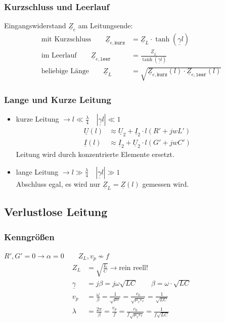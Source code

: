 \subsubsection{Kurzschluss und Leerlauf}
Eingangswiderstand $ \underline{Z}_e $ am Leitungsende:
\begin{align*}
\text{mit Kurzschluss} \qquad \underline{Z}_{e,\texttt{kurz}} & = \underline{Z}_L \cdot \tanh(\underline{\gamma}l)\\
\text{im Leerlauf} \qquad 
\underline{Z}_{e,\texttt{leer}} & = \tfrac{\underline{Z}_L}{\tanh(\underline{\gamma}l)}\\
\text{beliebige Länge} \qquad \underline{Z}_L &=\sqrt{\underline{Z}_{e,\texttt{kurz}}(l)\cdot \underline{Z}_{e,\texttt{leer}}(l)}
\end{align*}
\subsubsection{Lange und Kurze Leitung}
\begin{itemize}
	\item kurze Leitung $\rightarrow l \ll \tfrac{\lambda}{4} \quad |\underline{\gamma}l| \ll 1 $
		\begin{align*}
			\underline{U}(l) &\approx \underline{U}_2 + \underline{I}_2 \cdot l (R' + jwL')\\
			\underline{I}(l) &\approx \underline{I}_2 + \underline{U}_2 \cdot l (G'+jwC')
		\end{align*}
	Leitung wird durch konzentrierte Elemente ersetzt.
	\item lange Leitung $\rightarrow l \gg \tfrac{\lambda}{4} \quad |\underline{\gamma}l| \gg 1$\\
	Abschluss egal, es wird nur $ \underline{Z}_L = \underline{Z}(l) $ gemessen wird.
\end{itemize}


\subsection{Verlustlose Leitung}
\subsubsection{Kenngrößen}
$ R', G' = 0 \rightarrow \alpha = 0 \qquad Z_L, v_p \nsim f$
\begin{align*}
	Z_L  & =  \sqrt{\frac{L}{C}} \rightarrow \text{rein reell!}                                                                         \\
    \underline{\gamma}  & = j \beta  = j \omega \sqrt{LC} \qquad \beta = \omega \cdot \sqrt{LC} \\
    v_p                & = \frac{\omega}{\beta} = \frac{1}{\sqrt{\mu\varepsilon}}= \frac{c_0}{\sqrt{\mu_r\varepsilon_r}} = \frac{1}{\sqrt{LC}} \\
    \lambda            & = \frac{2\pi}{\beta}= \frac{v_p}{f}= \frac{c_0}{f\sqrt{\mu_r\varepsilon_r}}=\frac{1}{f\sqrt{LC}}
\end{align*}

